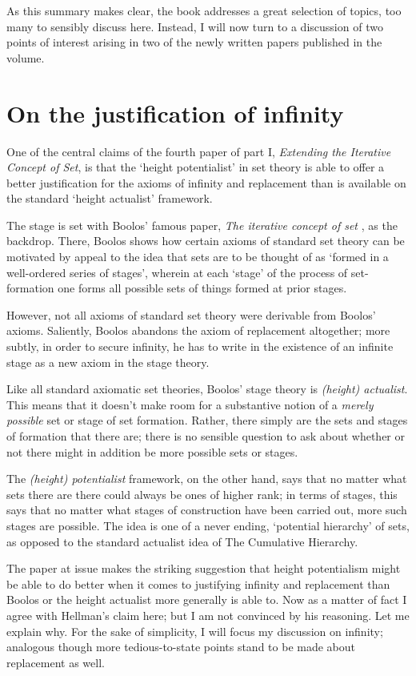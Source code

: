 \documentclass{amsart}
\theoremstyle{definition}
\begin{document}
As this summary makes clear, the book addresses a great
selection of topics, too many to sensibly discuss here. Instead, 
I will now turn to a discussion of two points of interest 
arising in two of the newly written papers published in the volume.

\section{On the justification of infinity}

One of the central claims of the fourth paper of part I, 
\emph{Extending the Iterative Concept of Set}, 
is that the `height potentialist' in set theory 
is able to offer a better justification for 
the axioms of infinity and replacement
than is available on the standard `height actualist' framework.

The stage is set with Boolos' famous paper,
\emph{The iterative concept of set} \cite{Boolos1971a},
as the backdrop. There, 
Boolos shows how certain axioms of standard set theory 
can be motivated by appeal to 
the idea that sets are to be thought of as 
`formed in a well-ordered series of stages',
wherein at each `stage' of the process of set-formation 
one forms all possible sets 
of things formed at prior stages. 

However,
not all axioms of standard set theory were derivable 
from Boolos' axioms. Saliently, Boolos abandons the axiom of replacement 
altogether; more subtly, in order to secure infinity, 
he has to write in the existence of an infinite stage as a new axiom 
in the stage theory.

Like all standard axiomatic set theories, Boolos' stage theory is
\emph{(height) actualist}. This means that it doesn't make room for 
a substantive notion of a \emph{merely possible} set or stage of set formation.
Rather, there simply are the sets and stages of formation that there are;
there is no sensible question to ask about whether or not there might in addition be
more possible sets or stages.

The \emph{(height) potentialist} framework, on the other hand, 
says that no matter what sets there are there could always be ones of higher rank;
in terms of stages, this says that 
no matter what stages of construction have been carried out,
more such stages are possible. The idea is one of a never ending, 
`potential hierarchy' of sets, as opposed to the standard actualist 
idea of The Cumulative Hierarchy.

The paper at issue makes the striking suggestion that height potentialism
might be able to do better 
when it comes to justifying infinity and replacement 
than Boolos or the height actualist more generally is able to. 
Now as a matter of fact I agree with Hellman's claim here;
but I am not convinced by his reasoning.
Let me explain why. For the sake of simplicity, I will focus my discussion on infinity; 
analogous though more tedious-to-state points stand to be made 
about replacement as well.
\end{document}
